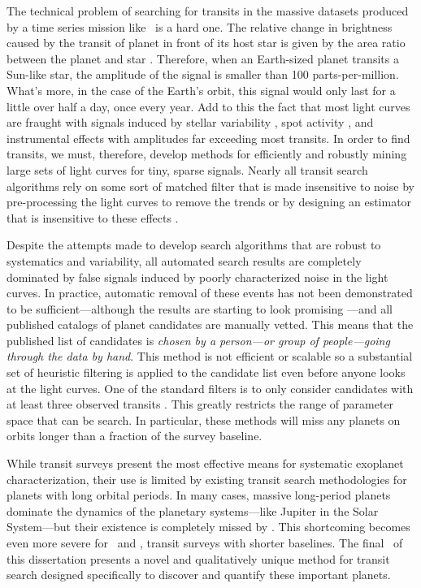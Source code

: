 The technical problem of searching for transits in the massive datasets
produced by a time series mission like \kepler\ is a hard one.
The relative change in brightness caused by the transit of planet in front of
its host star is given by the area ratio between the planet and star
\citep{Winn:2010}.
Therefore, when an Earth-sized planet transits a Sun-like star, the amplitude
of the signal is smaller than 100 parts-per-million.
What's more, in the case of the Earth's orbit, this signal would only last for
a little over half a day, once every year.
Add to this the fact that most light curves are fraught with signals induced
by stellar variability \citep{Basri:2013}, spot activity
\citep{McQuillan:2014}, and instrumental effects \citep{Stumpe:2012,
Smith:2012} with amplitudes far exceeding most transits.
In order to find transits, we must, therefore, develop methods for efficiently
and robustly mining large sets of light curves for tiny, sparse signals.
Nearly all transit search algorithms rely on some sort of matched filter that
is made insensitive to noise by pre-processing the light curves to remove the
trends or by designing an estimator that is insensitive to these effects
\citep[][]{Kovacs:2002, Kovacs:2005, Berta:2012, Petigura:2013,
Foreman-Mackey:2015}.

Despite the attempts made to develop search algorithms that are robust to
systematics and variability, all automated search results are completely
dominated by false signals induced by poorly characterized noise in the light
curves.
In practice, automatic removal of these events has not been demonstrated to be
sufficient---although the results are starting to look promising
\citep{Jenkins:2014}---and all published catalogs of planet candidates are
manually vetted.
This means that the published list of candidates is \emph{chosen by a
person---or group of people---going through the data by hand}.
This method is not efficient or scalable so a substantial set of heuristic
filtering is applied to the candidate list even before anyone looks at the
light curves.
One of the standard filters is to only consider candidates with at least three
observed transits \citep[for example][]{Petigura:2013, Burke:2014, Rowe:2015}.
This greatly restricts the range of parameter space that can be search.
In particular, these methods will miss any planets on orbits longer than a
fraction of the survey baseline.

While transit surveys present the most effective means for systematic
exoplanet characterization, their use is limited by existing transit search
methodologies for planets with long orbital periods.
In many cases, massive long-period planets dominate the dynamics of the
planetary systems---like Jupiter in the Solar System---but their existence is
completely missed by \kepler.
This shortcoming becomes even more severe for \KT\ and \tess, transit surveys
with shorter baselines.
The final \chapname\ of this dissertation presents a novel and qualitatively
unique method for transit search designed specifically to discover and
quantify these important planets.

